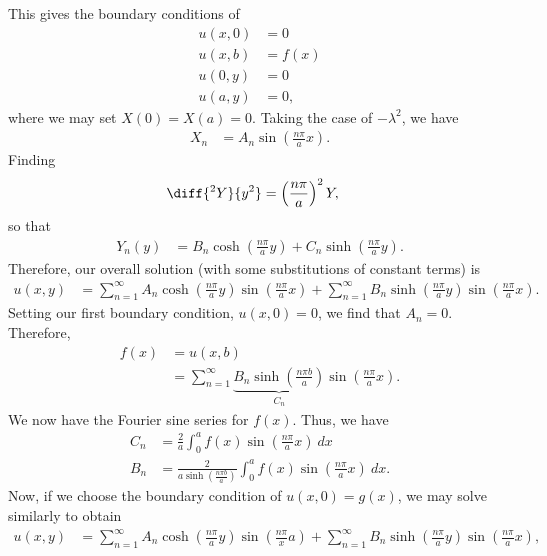 \documentclass[10pt]{mypackage}
\begin{document}
\begin{example}
  This gives the boundary conditions of
  \begin{align*}
    u\left( x,0 \right) &= 0\\
    u\left( x,b \right) &= f(x) \\
    u\left( 0,y \right) &= 0\\
    u\left( a,y \right) &= 0,
  \end{align*}
  where we may set $X\left( 0 \right)=X\left( a \right) = 0$. Taking the case of $-\lambda^2$, we have
  \begin{align*}
    X_n &= A_n\sin\left( \frac{n\pi }{a}x \right).
  \end{align*}
  Finding
  \begin{align*}
    \diff{^2Y}{y^2} &= \left( \frac{n\pi}{a} \right)^2 Y,
  \end{align*}
  so that
  \begin{align*}
    Y_n(y) &= B_n \cosh\left( \frac{n\pi }{a}y \right) + C_n\sinh\left( \frac{n\pi }{a}y \right).
  \end{align*}
  Therefore, our overall solution (with some substitutions of constant terms) is
  \begin{align*}
    u\left( x,y \right) &= \sum_{n=1}^{\infty}A_n\cosh\left( \frac{n\pi }{a} y\right)\sin\left( \frac{n\pi }{a}x \right) + \sum_{n=1}^{\infty}B_n \sinh\left( \frac{n\pi }{a}y \right) \sin\left( \frac{n\pi}{a}x \right).
  \end{align*}
  Setting our first boundary condition, $u\left( x,0 \right) = 0$, we find that $A_n  = 0$. Therefore,
  \begin{align*}
    f(x) &= u\left( x,b \right)\\
         &= \sum_{n=1}^{\infty}\underbrace{B_n\sinh\left( \frac{n\pi b}{a} \right)}_{C_n}\sin\left( \frac{n\pi}{a}x \right).
  \end{align*}
  We now have the Fourier sine series for $f(x)$. Thus, we have
  \begin{align*}
    C_n &= \frac{2}{a}\int_{0}^{a} f(x)\sin\left( \frac{n\pi}{a}x \right)\:dx\\
    B_n &= \frac{2}{a\sinh\left( \frac{n\pi b}{a} \right)} \int_{0}^{a} f(x)\sin\left( \frac{n\pi}{a}x \right)\:dx.
  \end{align*}
  Now, if we choose the boundary condition of $u\left( x,0 \right) = g(x)$, we may solve similarly to obtain
  \begin{align*}
    u\left( x,y \right) &= \sum_{n=1}^{\infty} A_n\cosh\left( \frac{n\pi}{a}y \right)\sin\left( \frac{n\pi}{x}a \right) + \sum_{n=1}^{\infty}B_n\sinh\left( \frac{n\pi}{a}y \right)\sin\left( \frac{n\pi}{a}x \right),

\end{align*}
\end{example}
\end{document}
